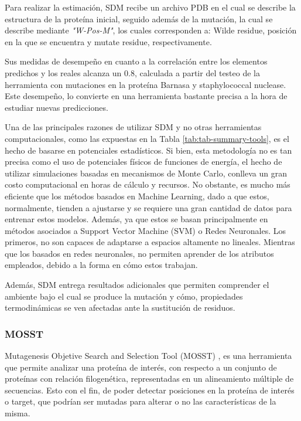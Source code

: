 Para realizar la estimación, SDM recibe un archivo PDB en el cual se describe la estructura de la proteína inicial, seguido además de la mutación, la cual se describe mediante \textit{"W-Pos-M"}, los cuales corresponden a: Wilde residue, posición en la que se encuentra y mutate residue, respectivamente.

Sus medidas de desempeño en cuanto a la correlación entre los elementos predichos y los reales alcanza un 0.8, calculada a partir del testeo de la herramienta con mutaciones en la proteína Barnasa y staphylococcal nuclease. Este desempeño, lo convierte en una herramienta bastante precisa a la hora de estudiar nuevas predicciones.

Una de las principales razones de utilizar SDM y no otras herramientas computacionales, como las expuestas en la Tabla \ref{tab:tab-summary-tools}, es el hecho de basarse en potenciales estadísticos. Si bien, esta metodología no es tan precisa como el uso de potenciales físicos de funciones de energía, el hecho de utilizar simulaciones basadas en mecanismos de Monte Carlo, conlleva un gran costo computacional en horas de cálculo y recursos. No obstante, es mucho más eficiente que los métodos basados en Machine Learning, dado a que estos, normalmente, tienden a ajustarse y se requiere una gran cantidad de datos para entrenar estos modelos. Además, ya que estos se basan principalmente en métodos asociados a Support Vector Machine (SVM) o Redes Neuronales. Los primeros, no son capaces de adaptarse a espacios altamente no lineales. Mientras que los basados en redes neuronales, no permiten aprender de los atributos empleados, debido a la forma en cómo estos trabajan.

Además, SDM entrega resultados adicionales que permiten comprender el ambiente bajo el cual se produce la mutación y cómo, propiedades termodinámicas se ven afectadas ante la sustitución de residuos.

\subsubsection{MOSST}

Mutagenesis Objetive Search and Selection Tool (MOSST) \cite{Olivera-Nappa2011}, es una herramienta que permite analizar una proteína de interés, con respecto a un conjunto de proteínas con relación filogenética, representadas en un alineamiento múltiple de secuencias. Esto con el fin, de poder detectar posiciones en la proteína de interés o target, que podrían ser mutadas para alterar o no las características de la misma.


